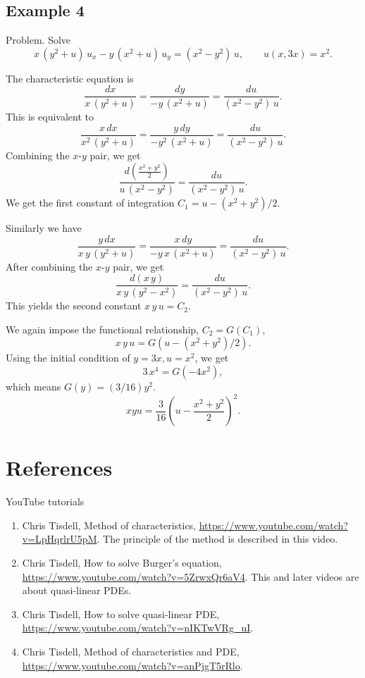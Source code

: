 \documentclass{article}
\begin{document}
\subsection{Example 4}

Problem.
Solve
$$
x \, (y^2 + u) \, u_x - y \, (x^2 + u) \, u_y = (x^2 - y^2) \, u,
\qquad
u(x, 3x) = x^2.
$$

The characteristic equation is
$$
\frac{ dx } { x \, (y^2 + u) }
=
\frac{ dy } { -y \, (x^2 + u) }
=
\frac{ du } { (x^2 - y^2) \, u }.
$$
This is equivalent to
$$
\frac{ x \, dx } { x^2 \, (y^2 + u) }
=
\frac{ y \, dy } { -y^2 \, (x^2 + u) }
=
\frac{ du } { (x^2 - y^2) \, u }.
$$
Combining the $x$-$y$ pair, we get
$$
\frac{ d(\frac{x^2 + y^2}{2}) } { u \, (x^2 - y^2) }
=
\frac{ du } { (x^2 - y^2) \, u }.
$$
We get the first constant of integration
$C_1 = u - (x^2 + y^2)/2$.

Similarly we have
$$
\frac{ y \, dx } { x \, y \, (y^2 + u) }
=
\frac{ x \, dy } { -y \, x \, (x^2 + u) }
=
\frac{ du } { (x^2 - y^2) \, u }.
$$
After combining the $x$-$y$ pair, we get
$$
\frac{ d (x \, y) } { x \, y \, (y^2 - x^2) }
=
\frac{ du } { (x^2 - y^2) \, u }.
$$
This yields the second constant $x \, y \, u = C_2$.

We again impose the functional relationship, $C_2 = G(C_1)$,
$$
x \, y \, u = G(u - (x^2 +y^2)/2).
$$
Using the initial condition of $y = 3x, u = x^2$, we get
$$
3\, x^4 = G(-4 x^2),
$$
which means $G(y) = (3/16) y^2$.
$$
x y u = \frac{3}{16} \left( u - \frac{x^2+y^2}{2} \right)^2.
$$


\section{References}

YouTube tutorials
\begin{enumerate}
\item
Chris Tisdell, Method of characteristics, \url{https://www.youtube.com/watch?v=LpHqrlrU5pM}.
The principle of the method is described in this video.

\item
Chris Tisdell, How  to solve Burger's equation, \url{https://www.youtube.com/watch?v=5ZrwxQr6aV4}.
This and later videos are about quasi-linear PDEs.

\item
Chris Tisdell, How to solve quasi-linear PDE, \url{https://www.youtube.com/watch?v=nIKTwVRg_uI}.

\item
Chris Tisdell, Method of characteristics and PDE, \url{https://www.youtube.com/watch?v=anPjgT5rRlo}.
\end{enumerate}
\end{document}
